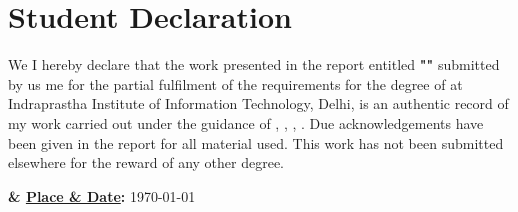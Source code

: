 
\chapter*{\centering Student Declaration}

\begin{minipage}{\textwidth}
    \begin{flushleft}  
        \ifdefined\twoAuthor We \else I \fi
        hereby declare that the work presented in the report entitled \textbf{"\projTitle"} submitted by 
        \ifdefined\twoAuthor us \else me \fi
        for the partial fulfilment of the requirements for the degree of \textit{\prog} at
        Indraprastha Institute of Information Technology, Delhi, is an authentic record of my work carried out under the guidance of 
        \textbf{\advisorone} \ifx\advisortwo\empty\else, \textbf{\advisortwo}\fi \ifx\advisorthree\empty\else, \textbf{\advisorthree}\fi \ifx\advisorfour\empty\else, \textbf{\advisorfour}\fi. 
        Due acknowledgements have been given in the report for all material used. 
        This work has not been submitted elsewhere for the reward of any other degree.


        \vspace{0.5in}

        \textbf{
            \projAuthorOneName
            \ifdefined\twoAuthor
                { \& \projAuthorTwoName}
            \fi
            } \hfill
        {\textbf{\underline{Place \& Date}:} \today} \\ 

    \end{flushleft}
\end{minipage}

\vfill


